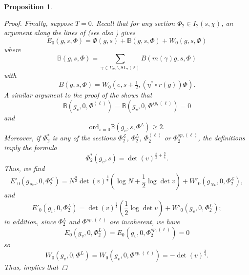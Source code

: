 \documentclass[reqno,oneside]{amsart}
\theoremstyle{plain}
\newtheorem{proposition}[theorem]{Proposition}
\theoremstyle{remark}
\numberwithin{theorem}{section}
\newcommand{\bbB}{\mathbb B}
\newcommand{\bbZ}{\mathbb Z}
\newcommand{\calL}{\mathcal L}
\newcommand{\ord}{\mathrm{ord}}
\begin{document}
\begin{proposition}
\begin{proof}
			Finally, suppose $T= 0$. Recall that for any section $\Phi_2 \in I_2(s, \chi)$, an argument along the lines of \cite[\S 5.9]{KRYbook} (see also \cite[Lemma 2.4]{KudlaRallisSW}) gives
			\begin{equation}
			E_0(g, s, \Phi) = \Phi(g,s) + \bbB(g, s, \Phi) + W_0(g, s, \Phi)
			\end{equation}
			where
			\begin{equation}
			\bbB(g, s, \Phi) = \sum_{\gamma \in \Gamma_{\infty} \backslash \mathrm{SL}_2(\bbZ)} B(m(\gamma)g, s, \Phi)
			\end{equation}
			with
			\begin{equation}
			B(g, s, \Phi) = W_0\left(e, s + \tfrac12, \left( \eta^* \circ r(g) \right) \Phi \right).
			\end{equation}
			A similar argument to the proof of the  shows that
			\begin{equation}
			\bbB(g_v, 0, \Phi^{(\ell)}) = \bbB(g_v, 0, \Phi^{sp, (\ell)}) = 0
			\end{equation}
			and
			\begin{equation}
			\ord_{s=0} \bbB(g_v, s, \Phi^L) \geq 2 .
			\end{equation}
			Moreover, if $\Phi^*_2$ is any of the sections $\Phi^{\calL}_2$, $\Phi^{L}_2$, $\Phi^{(\ell)}_2$ or $\Phi^{sp, (\ell)}_2$, the definitions  imply the formula
			\begin{equation}
			\Phi^{*}_2(g_v, s)= \det(v)^{\frac{s}2 + \frac34}.
			\end{equation}
			Thus, we find
			\begin{equation}
			E'_0(g_{Nv}, 0, \Phi^\calL_2) = N^{\frac32} \det(v)^{\frac34} \left( \log N + \frac12 \log \det v \right) + W'_0(g_{Nv}, 0, \Phi_2^{\calL}),
			\end{equation}
			and
			\begin{equation}
			E'_0(g_{ v}, 0, \Phi^L_2)  =  \det(v)^{\frac34} \left(  \frac12 \log \det v \right) + W'_0(g_{v}, 0, \Phi_2^{L});
			\end{equation}
			in addition, since $\Phi^L_2$ and $\Phi^{sp,(\ell)}$ are incoherent, we have
			\begin{equation}
			E_0(g_v, 0, \Phi_2^{L}) = E_0(g_v, 0, \Phi_2^{sp,(\ell)}) =  0
			\end{equation}
			so
			\begin{equation}
			W_{0}(g_v, 0, \Phi^{L}) = W_0(g_v,0,\Phi^{sp,(\ell)}) = - \det(v)^{\frac34}.
			\end{equation}
			Thus,   implies that

\end{proof}
\end{proposition}
\end{document}
